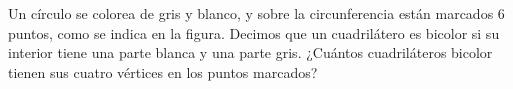 Un círculo se colorea de gris y blanco, y sobre la circunferencia están marcados $6$ puntos, como se indica en la figura. Decimos que un cuadrilátero es bicolor si su interior tiene una parte blanca y una parte gris. ¿Cuántos cuadriláteros bicolor tienen sus cuatro vértices en los puntos marcados?